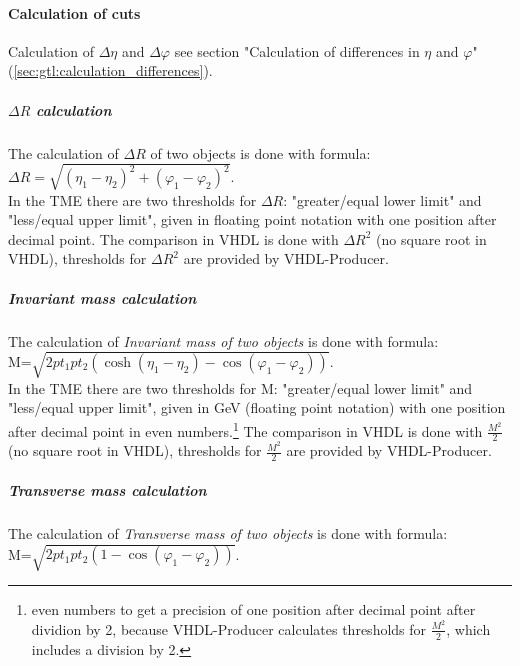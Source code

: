 \paragraph{Calculation of cuts}
\label{sec:gtl:delta_r_calculation}

Calculation of $\Delta\eta$ and $\Delta\varphi$ see section "Calculation of differences in $\eta$ and $\varphi$" (\ref{sec:gtl:calculation_differences}).

\subparagraph{$\Delta$$R$ calculation}
\label{sec:gtl:delta_r_calculation}

The calculation of \textit{$\Delta$$R$} of two objects is done with formula:\\ 

$\Delta$$R=\sqrt{(\eta_1-\eta_2)^2+(\varphi_1-\varphi_2)^2}$.\\

In the TME there are two thresholds for $\Delta$$R$: "greater/equal lower limit" and "less/equal upper limit", given in floating point notation
with one position after decimal point.
The comparison in VHDL is done with $\Delta$$R^2$ (no square root in VHDL), thresholds for $\Delta$$R^2$ are provided by VHDL-Producer.

\subparagraph{Invariant mass calculation}
\label{sec:gtl:inv_mass_calculation}

The calculation of \textit{Invariant mass of two objects} is done with formula:\\

M=$\sqrt{2 pt_1  pt_2 (\cosh(\eta_1-\eta_2)-\cos(\varphi_1-\varphi_2))}$.\\

In the TME there are two thresholds for M: "greater/equal lower limit" and "less/equal upper limit", given in GeV (floating point notation)
with one position after decimal point in even numbers.\footnote{even numbers to get a precision of one position after decimal point after dividion by 2,
because VHDL-Producer calculates thresholds for $\frac{M^2}{2}$, which includes a division by 2.}
The comparison in VHDL is done with $\frac{M^2}{2}$ (no square root in VHDL), thresholds for $\frac{M^2}{2}$ are provided by VHDL-Producer.

\subparagraph{Transverse mass calculation}
\label{sec:gtl:transverse_mass_calculation}

The calculation of \textit{Transverse mass of two objects} is done with formula:\\

M=$\sqrt{2 pt_1 pt_2 (1-\cos(\varphi_1-\varphi_2))}$.\\

